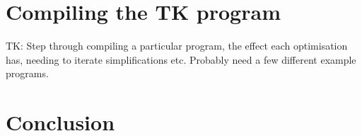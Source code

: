 \section{Compiling the TK program}

TK: Step through compiling a particular program, the effect each optimisation has,
needing to iterate simplifications etc. Probably need a few different example
programs.


\section{Conclusion}

% 

% 
% 
% 
% 
% 




\endinput

\section{Manipulating Terms}
\label{sec:manipulating_terms}

This section describes the basic operations required
for manipulating terms, upon which the optimisation algorithms are built.


